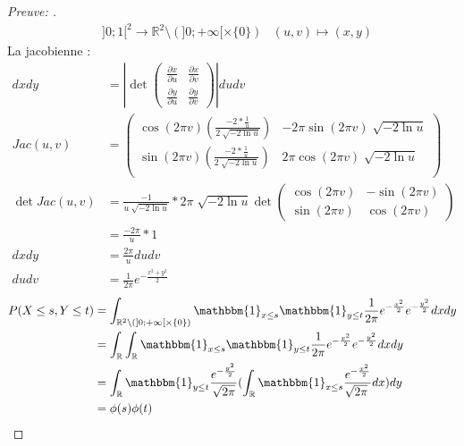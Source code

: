 \documentclass{article}
\theoremstyle{plain}%
\theoremstyle{definition}
\theoremstyle{remark}
\begin{document}
\begin{proof}[Preuve: ]
	\begin{align*}
		&]0;1[^2 \to \mathbb{R}^2 \setminus (]0;+\infty[ \times \{0\})
		&(u,v) \mapsto (x,y)
	\end{align*}
	La jacobienne : 
	\begin{align*}
		dxdy &= \left| \det \begin{pmatrix}
			\frac{\partial x}{\partial u} & \frac{\partial x}{\partial v} \\
			\frac{\partial y}{\partial u} & \frac{\partial y}{\partial v} 
		\end{pmatrix}
		\right| du dv \\
		Jac(u,v) &= \begin{pmatrix}
			\cos (2 \pi v) ( \frac{-2 * \frac{1}{u}}{2 \sqrt[]{-2 \ln u}}) & -2 \pi \sin (2 \pi v) \sqrt[]{-2 \ln u}\\
			\sin (2 \pi v) ( \frac{-2 * \frac{1}{u}}{2 \sqrt[]{-2 \ln u}}) & 2 \pi \cos (2 \pi v) \sqrt[]{-2 \ln u}\\
		\end{pmatrix} \\
		\det Jac(u,v) &= \frac{-1}{u \sqrt[]{-2 \ln u}} * 2 \pi \sqrt[]{-2 \ln u} \det \begin{pmatrix}
			\cos (2 \pi v) & -\sin (2 \pi v) \\
			\sin (2 \pi v) & \cos (2 \pi v)
		\end{pmatrix} \\
		&= \frac{-2 \pi }{u} * 1 \\ 
		dxdy &= \frac{2 \pi }{u} dudv \\
		dudv &= \frac{1}{2 \pi} e^{- \frac{x^2 + y^2}{2}}
	\end{align*}
	\begin{align*}
		P(X \leq s, Y \leq t) &= \int_{\mathbb{R}^2 \setminus (]0;+\infty[ \times \{0\} ) } \mathbbm{1}_{x \leq s} \mathbbm{1}_{y \leq t} \frac{1}{2 \pi } e^{- \frac{x^2}{2}} e^{-\frac{y^2}{2}}dxdy \\
		&= \int_{\mathbb{R}} \int_{\mathbb{R}} \mathbbm{1}_{x \leq s} \mathbbm{1}_{y \leq t} \frac{1}{2 \pi } e^{- \frac{x^2}{2}} e^{-\frac{y^2}{2}}dxdy \\
		&= \int_{\mathbb{R}} \mathbbm{1}_{y \leq t} \frac{e^{-\frac{y^2}{2}}}{\sqrt{2 \pi }} (\int_{\mathbb{R}} \mathbbm{1}_{x \leq s} \frac{e^{- \frac{x^2}{2}}}{\sqrt[]{2 \pi }} dx ) dy \\
		&= \phi (s) \phi (t)
	\end{align*}
\end{proof}
\end{document}
